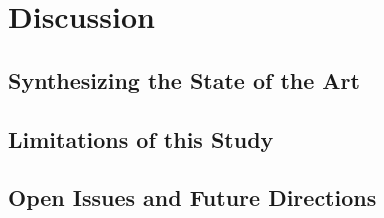 \section{Discussion\label{sec:sota.discuss}}

\subsection{Synthesizing the State of the Art\label{sec:sota.discuss.synthesis}}

\subsection{Limitations of this Study\label{sec:sota.discuss.limits}}

\subsection{Open Issues and Future Directions\label{sec:sota.discuss.open}}


